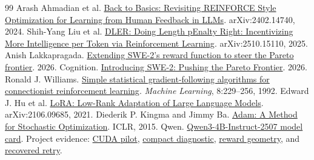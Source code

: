 \documentclass[11pt]{article}
\begin{document}
\begin{thebibliography}{99}
 Arash Ahmadian et al.
\href{https://arxiv.org/abs/2402.14740}{Back to Basics: Revisiting REINFORCE Style Optimization for Learning from Human Feedback in LLMs}. arXiv:2402.14740, 2024.
 Shih-Yang Liu et al.
\href{https://arxiv.org/abs/2510.15110}{DLER: Doing Length pEnalty Right: Incentivizing More Intelligence per Token via Reinforcement Learning}. arXiv:2510.15110, 2025.
 Anish Lakkapragada.
\href{https://anishlk.com/swe-2-extended/}{Extending SWE-2's reward function to steer the Pareto frontier}. 2026.
 Cognition.
\href{https://cognition.com/blog/swe-2}{Introducing SWE-2: Pushing the Pareto Frontier}. 2026.
 Ronald J. Williams.
\href{https://link.springer.com/article/10.1007/BF00992696}{Simple statistical gradient-following algorithms for connectionist reinforcement learning}.
\emph{Machine Learning}, 8:229--256, 1992.
 Edward J. Hu et al.
\href{https://arxiv.org/abs/2106.09685}{LoRA: Low-Rank Adaptation of Large Language Models}. arXiv:2106.09685, 2021.
 Diederik P. Kingma and Jimmy Ba.
\href{https://arxiv.org/abs/1412.6980}{Adam: A Method for Stochastic Optimization}. ICLR, 2015.
 Qwen.
\href{https://huggingface.co/Qwen/Qwen3-4B-Instruct-2507}{Qwen3-4B-Instruct-2507 model card}.
 Project evidence:
\href{https://github.com/arpjw/reward-function/blob/research-v1.1.0/docs/CAPABILITY_CUDA_RESULTS.md}{CUDA pilot},
\href{https://github.com/arpjw/reward-function/blob/research-v1.1.0/docs/COMPACT_REWARD_RESULTS.md}{compact diagnostic},
\href{https://github.com/arpjw/reward-function/blob/research-v1.1.0/docs/REWARD_GEOMETRY_DIAGNOSIS.md}{reward geometry}, and
\href{https://github.com/arpjw/reward-function/blob/research-v1.1.0/docs/REWARD_CONTRAST_RETRY_INTERRUPTION.md}{recovered retry}.
\end{thebibliography}
\end{document}
